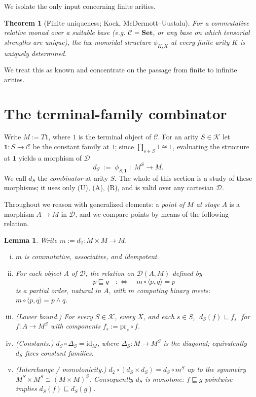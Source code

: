 \documentclass{article}
\newtheorem{theorem}{Theorem}
\newtheorem{lemma}{Lemma}
\newcommand{\C}{\mathcal{C}}
\newcommand{\D}{\mathcal{D}}
\newcommand{\K}{\mathcal{K}}
\newcommand{\Set}{\mathbf{Set}}
\newcommand{\id}{\mathrm{id}}
\begin{document}
We isolate the only input concerning finite arities.

\begin{theorem}[Finite uniqueness; Kock, McDermott--Uustalu]\label{hyp:fin}
For a commutative relative monad over a suitable base \textnormal{(}e.g.
$\C=\Set$, or any base on which tensorial strengths are unique\textnormal{)},
the lax monoidal structure $\phi_{K,X}$ at every \emph{finite} arity $K$ is
uniquely determined.
\end{theorem}

We treat this as known and concentrate on the passage from finite to infinite
arities.

\section{The terminal-family combinator}

Write $M:=T1$, where $1$ is the terminal object of $\C$. For an arity $S\in\K$
let $\mathbf 1\colon S\to\C$ be the constant family at $1$; since
$\prod_{s\in S}1\cong 1$, evaluating the structure at $\mathbf 1$ yields a
morphism of $\D$
\[
  d_S \;:=\; \phi_{S,\mathbf 1}\;\colon\; M^{S}\longrightarrow M .
\]
We call $d_S$ the \emph{combinator} at arity $S$. The whole of this section is a
study of these morphisms; it uses only (U), (A), (R), and is valid over any
cartesian $\D$.

Throughout we reason with generalized elements: a \emph{point of $M$ at stage
$A$} is a morphism $A\to M$ in $\D$, and we compare points by means of the
following relation.

\begin{lemma}\label{lem:semilattice}
Write $m:=d_2\colon M\times M\to M$.
\begin{enumerate}[(i)]
  \item $m$ is commutative, associative, and idempotent.
  \item For each object $A$ of $\D$, the relation on $\D(A,M)$ defined by
  \[
    p\sqsubseteq q \quad:\Longleftrightarrow\quad m\circ\langle p,q\rangle = p
  \]
  is a partial order, natural in $A$, with $m$ computing binary meets:
  $m\circ\langle p,q\rangle=p\wedge q$.
  \item \emph{(Lower bound.)} For every $S\in\K$, every $X$, and each $s\in S$,
  $\;d_S(f)\sqsubseteq f_s\;$ for $f\colon A\to M^{S}$ with components
  $f_s:=\mathrm{pr}_s\circ f$.
  \item \emph{(Constants.)} $d_S\circ\Delta_S=\id_M$, where
  $\Delta_S\colon M\to M^{S}$ is the diagonal; equivalently $d_S$ fixes constant
  families.
  \item \emph{(Interchange / monotonicity.)} $d_2\circ(d_S\times d_S)=d_S\circ
  m^{S}$ up to the symmetry $M^{S}\times M^{S}\cong (M\times M)^{S}$.
  Consequently $d_S$ is monotone: $f\sqsubseteq g$ pointwise implies
  $d_S(f)\sqsubseteq d_S(g)$.
\end{enumerate}
\end{lemma}
\end{document}

